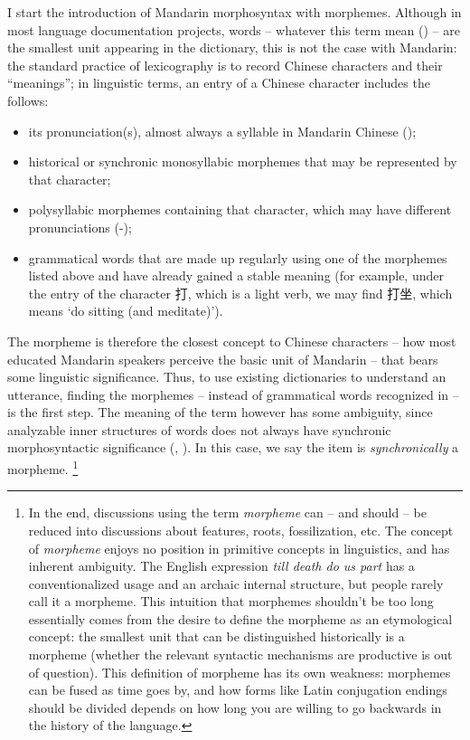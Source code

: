 \documentclass[UTF8, a4paper, oneside, scheme=plain, 12pt]{ctexrep}
\newcommand*{\term}[1]{\emph{#1}}
\newcommand{\form}[1]{\emph{#1}}
\newcommand{\translate}[1]{`#1'}
\begin{document}
I start the introduction of Mandarin morphosyntax 
with morphemes. 
Although in most language documentation projects, 
words -- whatever this term mean () -- 
are the smallest unit appearing in the dictionary, 
this is not the case with Mandarin:
the standard practice of lexicography 
is to record Chinese characters and their ``meanings''; 
in linguistic terms, 
an entry of a Chinese character includes the follows:
\begin{itemize}
    \item its pronunciation(s), almost always a syllable in Mandarin Chinese
    (); 
    \item historical or synchronic monosyllabic morphemes that may be represented by that character;
    \item polysyllabic morphemes containing that character,
    which may have different pronunciations 
    (-);
    \item grammatical words that are made up regularly using one of the morphemes listed above
    and have already gained a stable meaning
    (for example, under the entry of the character 打, 
    which is a light verb,
    we may find 打坐, which means \translate{do sitting (and meditate)}).
\end{itemize}
The morpheme is therefore the closest concept to Chinese characters 
-- how most educated Mandarin speakers perceive the basic unit of Mandarin
-- that bears some linguistic significance.
Thus, to use existing dictionaries to understand an utterance,
finding the morphemes -- instead of grammatical words recognized in  -- 
is the first step.
The meaning of the term however has some ambiguity,
since analyzable inner structures of words 
does not always have synchronic morphosyntactic significance
(, ).
In this case, we say the item is \emph{synchronically} a morpheme.%
\footnote{
    In the end, discussions using the term \term{morpheme} can -- and should -- 
    be reduced into discussions about features, roots, fossilization, etc.
    The concept of \term{morpheme} enjoys no position 
    in primitive concepts in linguistics, 
    and has inherent ambiguity. 
    The English expression \form{till death do us part} 
    has a conventionalized usage 
    and an archaic internal structure, 
    but people rarely call it a morpheme. 
    This intuition that morphemes shouldn't be too long 
    essentially comes from the desire to define the morpheme
    as an etymological concept:
    the smallest unit that can be distinguished historically
    is a morpheme 
    (whether the relevant syntactic mechanisms are productive 
    is out of question).
    This definition of morpheme
    has its own weakness: 
    morphemes can be fused as time goes by, 
    and how forms like Latin conjugation endings should be divided 
    depends on how long you are willing to go backwards 
    in the history of the language.
}
\end{document}
